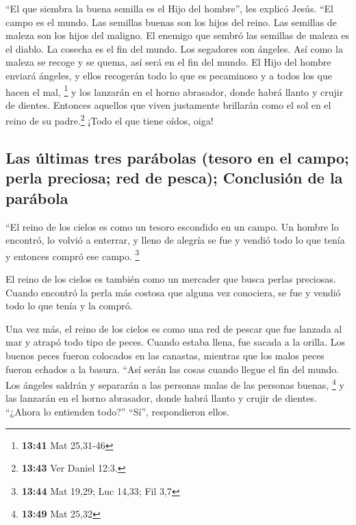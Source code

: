  ``El que siembra la buena semilla es el Hijo del
hombre'', les explicó Jesús.  ``El campo es el mundo. Las
semillas buenas son los hijos del reino. Las semillas de maleza son los
hijos del maligno.  El enemigo que sembró las semillas de
maleza es el diablo. La cosecha es el fin del mundo. Los segadores son
ángeles.  Así como la maleza se recoge y se quema, así
será en el fin del mundo.  El Hijo del hombre enviará
ángeles, y ellos recogerán todo lo que es pecaminoso y a todos los que
hacen el mal, \footnote{\textbf{13:41} Mat 25,31-46}  y
los lanzarán en el horno abrasador, donde habrá llanto y crujir de
dientes.  Entonces aquellos que viven justamente
brillarán como el sol en el reino de su padre.\footnote{\textbf{13:43}
  Ver Daniel 12:3.} ¡Todo el que tiene oídos, oiga!

\hypertarget{las-uxfaltimas-tres-paruxe1bolas-tesoro-en-el-campo-perla-preciosa-red-de-pesca-conclusiuxf3n-de-la-paruxe1bola}{%
\subsection{Las últimas tres parábolas (tesoro en el campo; perla
preciosa; red de pesca); Conclusión de la
parábola}\label{las-uxfaltimas-tres-paruxe1bolas-tesoro-en-el-campo-perla-preciosa-red-de-pesca-conclusiuxf3n-de-la-paruxe1bola}}

 ``El reino de los cielos es como un tesoro escondido en
un campo. Un hombre lo encontró, lo volvió a enterrar, y lleno de
alegría se fue y vendió todo lo que tenía y entonces compró ese campo.
\footnote{\textbf{13:44} Mat 19,29; Luc 14,33; Fil 3,7}

 El reino de los cielos es también como un mercader que
busca perlas preciosas.  Cuando encontró la perla más
costosa que alguna vez conociera, se fue y vendió todo lo que tenía y la
compró.

 Una vez más, el reino de los cielos es como una red de
pescar que fue lanzada al mar y atrapó todo tipo de peces.
 Cuando estaba llena, fue sacada a la orilla. Los buenos
peces fueron colocados en las canastas, mientras que los malos peces
fueron echados a la basura.  ``Así serán las cosas cuando
llegue el fin del mundo. Los ángeles saldrán y separarán a las personas
malas de las personas buenas, \footnote{\textbf{13:49} Mat 25,32}
 y las lanzarán en el horno abrasador, donde habrá llanto
y crujir de dientes.  ``¿Ahora lo entienden todo?''
``Sí'', respondieron ellos.

